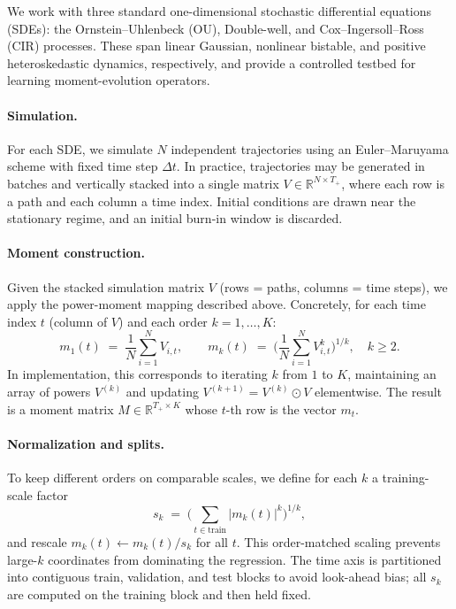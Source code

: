 \documentclass[journal, onecolumn]{IEEEtran}
\begin{document}
We work with three standard one-dimensional stochastic differential equations (SDEs):
the Ornstein--Uhlenbeck (OU), Double-well, and Cox--Ingersoll--Ross (CIR) processes.
These span linear Gaussian, nonlinear bistable, and positive heteroskedastic dynamics,
respectively, and provide a controlled testbed for learning moment-evolution operators.

\paragraph{Simulation.}
For each SDE, we simulate $N$ independent trajectories using an Euler--Maruyama scheme
with fixed time step $\Delta t$. In practice, trajectories may be generated in batches
and vertically stacked into a single matrix $V \in \mathbb{R}^{N \times T_+}$, where
each row is a path and each column a time index. Initial conditions are drawn near the
stationary regime, and an initial burn-in window is discarded.

\paragraph{Moment construction.}
Given the stacked simulation matrix $V$ (rows = paths, columns = time steps), we apply
the power-moment mapping described above. Concretely, for each time index $t$ (column of
$V$) and each order $k = 1,\dots,K$:
\[
m_1(t) \;=\; \frac{1}{N} \sum_{i=1}^N V_{i,t},
\qquad
m_k(t) \;=\; \Big( \frac{1}{N} \sum_{i=1}^N V_{i,t}^k \Big)^{1/k}, \quad k \ge 2.
\]
In implementation, this corresponds to iterating $k$ from $1$ to $K$, maintaining an
array of powers $V^{(k)}$ and updating $V^{(k+1)} = V^{(k)} \odot V$ elementwise.
The result is a moment matrix $M \in \mathbb{R}^{T_+ \times K}$ whose $t$-th row
is the vector $m_t$.

\paragraph*{Normalization and splits.}
To keep different orders on comparable scales, we define for each $k$ a training-scale
factor
\[
s_k \;=\; \Big( \sum_{t \in \text{train}} |m_k(t)|^k \Big)^{1/k},
\]
and rescale $m_k(t) \leftarrow m_k(t)/s_k$ for all $t$. This order-matched scaling
prevents large-$k$ coordinates from dominating the regression.
The time axis is partitioned into contiguous train, validation, and test blocks to
avoid look-ahead bias; all $s_k$ are computed on the training block and then held fixed.
\end{document}
